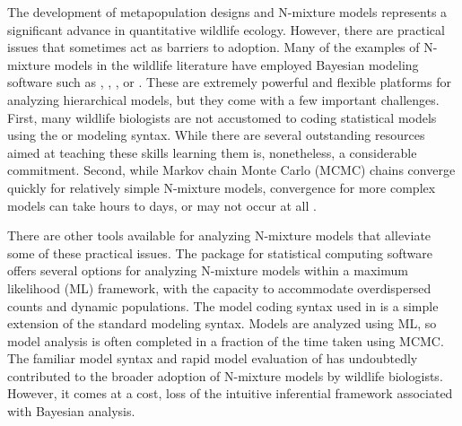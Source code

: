 \documentclass[codesnippet]{jss}
\begin{document}
The development of metapopulation designs and N-mixture models represents a significant advance in quantitative wildlife ecology. However, there are practical issues that sometimes act as barriers to adoption. Many of the examples of N-mixture models in the wildlife literature have employed Bayesian modeling software such as , , , or   \citep{plummer2003jags,Lunn_Jackson_Best_Thomas_Spiegelhalter_2012,Carpenter_Gelman_Hoffman_Lee_et_al_2017}. These are extremely powerful and flexible platforms for analyzing hierarchical models, but they come with a few important challenges. First, many wildlife biologists are not accustomed to coding statistical models using the  or  modeling syntax. While there are several outstanding resources aimed at teaching these skills  \citep{Royle_Dorazio_2008, Kery_2010, Kery_Schaub_2011, Kery_Royle_2015, Korner-Nievergelt_Roth_et_al_2015} learning them is, nonetheless, a considerable commitment. Second, while Markov chain Monte Carlo (MCMC) chains converge quickly for relatively simple N-mixture models, convergence for more complex models can take hours to days, or may not occur at all \citep{Kery_Schaub_2011}.

There are other tools available for analyzing N-mixture models that alleviate some of these practical issues. The  package \citep{Fiske_Chandler_2011} for  statistical computing software \citep{R_Core_Team_2016} offers several options for analyzing N-mixture models within a maximum likelihood (ML) framework, with the capacity to accommodate overdispersed counts and dynamic populations. The model coding syntax used in  is a simple extension of the standard  modeling syntax. Models are analyzed using ML, so model analysis is often completed in a fraction of the time taken using MCMC. The familiar model syntax and rapid model evaluation of  has undoubtedly contributed to the broader adoption of N-mixture models by wildlife biologists. However, it comes at a cost, loss of the intuitive inferential framework associated with Bayesian analysis.
\end{document}
